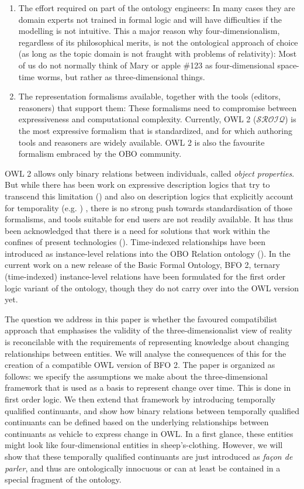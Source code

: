 \documentclass{ao2e}
\begin{document}
\begin{enumerate}
\item The effort required on part of the ontology engineers: In many cases
they are domain experts not trained in formal logic and will have difficulties
if the modelling is not intuitive. This a major reason why four-dimensionalism,
regardless of its philosophical merits, is not the ontological approach of
choice (as long as the topic domain is not fraught with problems of relativity):
Most of us do not normally think of Mary or apple \#123 as
four-dimensional space-time worms, but rather as three-dimensional things. 
\item The representation formalisms available, together with the tools (editors,
reasoners) that support them: These formalisms need to compromise between
expressiveness and computational complexity. Currently, OWL 2 ($\mathcal{SROIQ}$) is the
most expressive formalism that is standardized, and for which
authoring tools and reasoners are widely available. OWL 2 is also the favourite
formalism embraced by the OBO community. 
\end{enumerate}

OWL 2 allows only binary relations between individuals, called
\emph{object properties}. But while there has been work on expressive description
logics that try to transcend this limitation (\cite{Calvanese:1997}) and also on description logics
that explicitly account for temporality (e.g. \cite{Wolter:2001}) , there is no strong push
towards standardisation of those formalisms, and tools suitable for end users
are not readily available. It has thus been acknowledged that there is a need
for solutions that work within the confines of present technologies
(\cite{Welty:2006}).
Time-indexed relationships have been introduced as instance-level relations into
the OBO Relation ontology (\cite{OBO:RO}). In the current work on a new release of the Basic
Formal Ontology, BFO 2, ternary (time-indexed) instance-level relations have
been formulated for the first order logic variant of the ontology, though they
do not carry over into the OWL version yet.

The question we address in this paper is whether the favoured
compatibilist approach that emphasises the validity of the three-dimensionalist
view of reality is reconcilable with the requirements of
representing knowledge about changing relationships between entities. We will
analyse the consequences of this for the creation of a compatible OWL version of
BFO 2. The paper is organized as follows: we specify the assumptions we make
about the three-dimensional framework that is used as a basis to represent
change over time. This is done in first order logic. We then extend that
framework by introducing temporally qualified continuants, and show how binary
relations between temporally qualified continuants can be defined based on the
underlying relationships between continuants as vehicle to express change in
OWL. In a first glance, these entities might look like four-dimensional entities
in sheep's-clothing. However, we will show that these temporally qualified
continuants are just introduced as \emph{façon de parler}, and thus are
ontologically innocuous or can at least be contained in a special fragment of the ontology.
\end{document}
